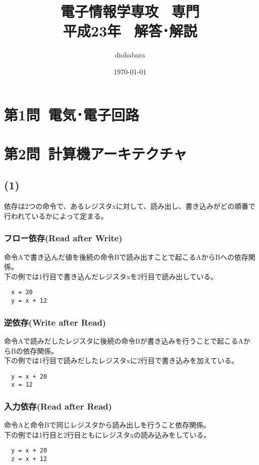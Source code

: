 \documentclass[a4paper,12pt,xelatex,ja=standard]{bxjsarticle}
\title{電子情報学専攻 \, 専門 \\ 平成23年 \, 解答･解説}
\author{diohabara}
\date{\today}
\begin{document}
\maketitle

\section*{第1問\ 電気･電子回路}

\section*{第2問\ 計算機アーキテクチャ}
\subsection*{(1)} %
依存は2つの命令で、あるレジスタxに対して、読み出し、書き込みがどの順番で行われているかによって定まる。
\subsubsection*{フロー依存(Read after Write)}
命令Aで書き込んだ値を後続の命令Bで読み出すことで起こるAからBへの依存関係。\\
下の例では1行目で書き込んだレジスタxを2行目で読み出している。
\begin{lstlisting}
  x = 20
  y = x + 12
\end{lstlisting}

\subsubsection*{逆依存(Write after Read)}
命令Aで読みだしたレジスタに後続の命令Bが書き込みを行うことで起こるAからBの依存関係。\\
下の例では1行目で読みだしたレジスタxに2行目で書き込みを加えている。
\begin{lstlisting}
  y = x + 20
  x = 12
\end{lstlisting}

\subsubsection*{入力依存(Read after Read)}
命令Aと命令Bで同じレジスタから読み出しを行うこと依存関係。 \\
下の例では1行目と2行目ともにレジスタxの読み込みをしている。
\begin{lstlisting}
  y = x + 20
  z = x + 12
\end{lstlisting}
\end{document}
